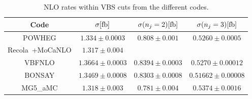 \documentclass[a4paper,10pt]{report}
\begin{document}
\begin{table}[h!]
    \begin{tabular}{c|c|c|c}
        Code  &  $\sigma[\rm{fb}]$  &  $\sigma(n_j=2)[\rm{fb}]$  &  $\sigma(n_j=3)[\rm{fb}]$\\
        \hline
        \hline
        {\sc POWHEG}  &  $1.334 \pm 0.0003$  &  $0.808 \pm  0.001$  &  $0.5260 \pm 0.0005$\\
        {\sc Recola}\ +{\sc MoCaNLO}  &  $1.317 \pm 0.004 $ \\
        {\sc VBFNLO}  &  $1.3664 \pm 0.0003$  &  $0.8394 \pm  0.0003$  &  $0.5270 \pm 0.00012$\\
        {\sc BONSAY}  &  $1.3469 \pm 0.0008$  &  $0.8303 \pm  0.0008$  &  $0.51662 \pm 0.00008$ \\
        {\sc MG5\_aMC}&  $1.318  \pm 0.003$  &  $0.781 \pm  0.004$  &  $0.5374 \pm 0.0016$\\
    \end{tabular}
    \caption{\label{tab:NLOrates} NLO rates within VBS cuts from the different codes.}
\end{table}
\end{document}
